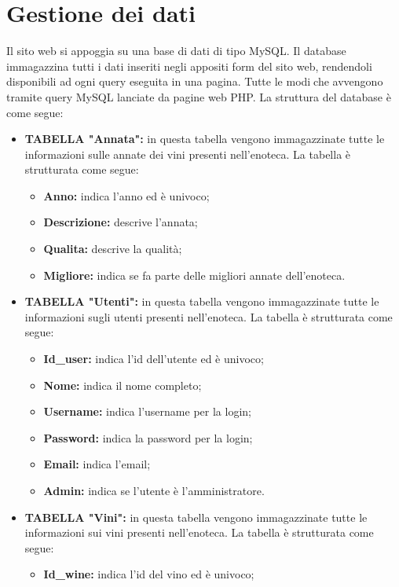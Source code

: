 \section{Gestione dei dati}

Il sito web si appoggia su una base di dati di tipo MySQL. Il database immagazzina
tutti i dati inseriti negli appositi form del sito web, rendendoli disponibili ad ogni
query eseguita in una pagina. Tutte le modiche avvengono tramite query MySQL
lanciate da pagine web PHP. La struttura del database è come segue:

\begin{itemize}
	\item \textbf{TABELLA "Annata":} in questa tabella vengono immagazzinate tutte le
	informazioni sulle annate dei vini presenti nell'enoteca. La tabella è strutturata come segue:
	\begin{itemize}
		\item \textbf{Anno:} indica l'anno ed è univoco;
		\item \textbf{Descrizione:} descrive l'annata;
		\item \textbf{Qualita:} descrive la qualità;
		\item \textbf{Migliore:} indica se fa parte delle migliori annate dell'enoteca.
	\end{itemize}	
	\item \textbf{TABELLA "Utenti":} in questa tabella vengono immagazzinate tutte le
	informazioni sugli utenti presenti nell'enoteca. La tabella è strutturata
	come segue:
	\begin{itemize}
		\item \textbf{Id\_user:} indica l'id dell'utente ed è univoco;
		\item \textbf{Nome:} indica il nome completo;
		\item \textbf{Username:} indica l'username per la login;
		\item \textbf{Password:} indica la password per la login;
		\item \textbf{Email:} indica l'email;
		\item \textbf{Admin:} indica se l'utente è l'amministratore.
	\end{itemize}
	\item \textbf{TABELLA "Vini":} in questa tabella vengono immagazzinate tutte le
	informazioni sui vini presenti nell'enoteca. La tabella è strutturata
	come segue:
	\begin{itemize}
		\item \textbf{Id\_wine:} indica l'id del vino ed è univoco;

\end{itemize}
\end{itemize}

